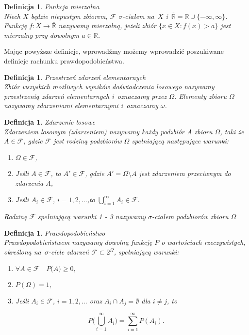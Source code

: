 \documentclass[12pt,a4paper]{report}
\newtheorem{definition}[theorem]{Definicja}
\begin{document}
\begin{definition}{Funkcja mierzalna \cite[w oparciu o rozdział 8.2]{rudnicki2006}}\\
Niech $X$ będzie niepustym zbiorem, $\mathcal{F}$  $\sigma$-ciałem na~$X$ i~$\overline{\mathbb{R}} = \mathbb{R} \cup \{-\infty, \infty \}$. Funkcję $f: X \rightarrow \overline{\mathbb{R}}$ nazywamy mierzalną, jeżeli zbiór $\{ x \in X: f(x) > a \}$ jest mierzalny przy dowolnym $a \in \mathbb{R}$.
\end{definition}

Mając powyższe definicje, wprowadźmy możemy wprowadzić poszukiwane definicje rachunku prawdopodobieństwa. 

\begin{definition}{Przestrzeń zdarzeń elementarnych \cite[w oparciu o rozdział 1.1]{krysicki1999}}\\
Zbiór wszyskich możliwych wyników doświadczenia losowego nazywamy przestrzenią zdarzeń elementarnych i~oznaczamy przez $\Omega$. Elementy zbioru $\Omega$ nazywamy zdarzeniami elementarnymi i~oznaczamy $\omega$.
\end{definition}

\begin{definition}{Zdarzenie losowe \cite[w oparciu o rozdział 1.1]{krysicki1999}}\\
Zdarzeniem losowym (zdarzeniem) nazywamy każdy podzbiór $\textit{A}$ zbioru $\Omega$, taki że  $A \in \mathcal{F}$, gdzie $\mathcal{F}$ jest rodziną podzbiorów $\Omega$ spełniającą następujące warunki:
\begin{enumerate}
\item $\Omega \in \mathcal{F}$,
\item Jeśli $A \in \mathcal{F}$, to $\textit{A$'$} \in \mathcal{F}$, gdzie $\textit{A$'$} = \Omega \setminus A $ jest zdarzeniem przeciwnym do zdarzenia $\textit{A}$,
\item Jeśli $\textit{A}_{i} \in \mathcal{F}$, $i= 1, 2, ...$,to $\bigcup\limits_{i=1}^{\infty} A_{i} \in \mathcal{F}. $
\end{enumerate}
Rodzinę $\mathcal{F}$ spełniającą warunki 1 - 3 nazywamy $\sigma$-ciałem podzbiorów zbioru $\Omega$
\end{definition}


\begin{definition}{Prawdopodobieństwo \cite[w oparciu o rozdział 1.1]{krysicki1999}}\\
Prawdopodobieństwem nazywamy dowolną funkcję $P$ o wartościach rzeczywistych, określoną na~$\sigma$-ciele zdarzeń $\mathcal{F} \subset 2^\Omega$, spełniającą warunki: 
\begin{enumerate}
\item $\forall{\textit{A} \in \mathcal{F}} \quad \textit{P(A)} \geq 0,$
\item $\textit{P}(\Omega) = 1,$
\item Jeśli $\textit{A}_{i} \in \mathcal{F}$, $i= 1, 2, ...$ oraz $A_{i} \cap A_{j} = \emptyset $ dla $i \neq j$, to 
\end{enumerate}

$$P \Big(\bigcup\limits_{i=1}^{\infty} A_{i} \Big)=\sum_{i=1}^{\infty} P(A_{i}). $$

\end{definition}
\end{document}
